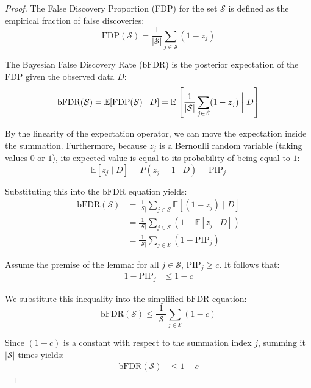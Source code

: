 \begin{proof}
The False Discovery Proportion (FDP) for the set $\mathcal{S}$ is defined as the empirical fraction of false discoveries:
\[
\text{FDP}(\mathcal{S}) = \frac{1}{|\mathcal{S}|} \sum_{j \in \mathcal{S}} (1 - z_j)
\]

The Bayesian False Discovery Rate ($\text{bFDR}$) is the posterior expectation of the FDP given the observed data $D$:
\[
\text{bFDR}(\mathcal{S}) = \mathbb{E}[\text{FDP}(\mathcal{S}) \mid D] = \mathbb{E} \left[ \frac{1}{|\mathcal{S}|} \sum_{j \in \mathcal{S}} (1 - z_j) \biggm| D \right]
\]

By the linearity of the expectation operator, we can move the expectation inside the summation. Furthermore, because $z_j$ is a Bernoulli random variable (taking values $0$ or $1$), its expected value is equal to its probability of being equal to $1$:
\[
\mathbb{E}[z_j \mid D] = P(z_j = 1 \mid D) = \text{PIP}_j
\]

Substituting this into the $\text{bFDR}$ equation yields:
\begin{align*}
\text{bFDR}(\mathcal{S}) &= \frac{1}{|\mathcal{S}|} \sum_{j \in \mathcal{S}} \mathbb{E}[(1 - z_j) \mid D] \\
&= \frac{1}{|\mathcal{S}|} \sum_{j \in \mathcal{S}} (1 - \mathbb{E}[z_j \mid D]) \\
&= \frac{1}{|\mathcal{S}|} \sum_{j \in \mathcal{S}} (1 - \text{PIP}_j)
\end{align*}

Assume the premise of the lemma: for all $j \in \mathcal{S}$, $\text{PIP}_j \ge c$. It follows that:
\begin{align*}
1 - \text{PIP}_j &\le 1 - c
\end{align*}

We substitute this inequality into the simplified $\text{bFDR}$ equation:
\[
\text{bFDR}(\mathcal{S}) \le \frac{1}{|\mathcal{S}|} \sum_{j \in \mathcal{S}} (1 - c)
\]

Since $(1 - c)$ is a constant with respect to the summation index $j$, summing it $|\mathcal{S}|$ times yields:
\begin{align*}
\text{bFDR}(\mathcal{S}) &\le 1 - c
\end{align*}
\end{proof}

\newpage

